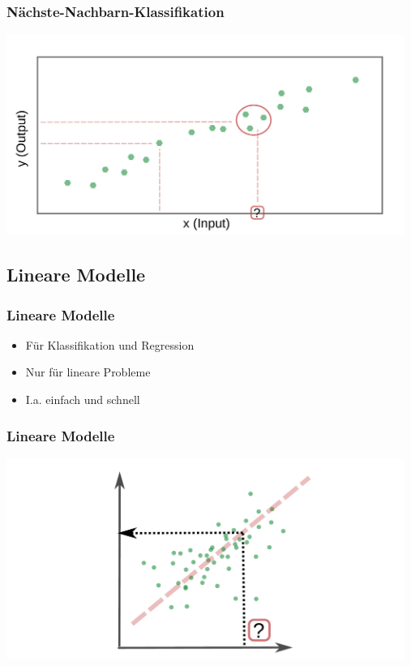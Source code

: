 \documentclass[aspectratio=169]{beamer}
\begin{document}
\begin{frame}
  \frametitle{Nächste-Nachbarn-Klassifikation}
  \begin{center}
    \includegraphics[width=13.0cm]{images/k_nearest_neighbour_regression_k_3.pdf}
  \end{center}
\end{frame}


\subsection{Lineare Modelle}

\setcounter{tocdepth}{2}
\begin{frame}{}
   \tableofcontents[currentsubsection,hideothersubsections,
     subsectionstyle=show/shaded]
\end{frame}

\begin{frame}
  \frametitle{Lineare Modelle}  
  \begin{block}{}
    \begin{itemize}
    \item Für Klassifikation und Regression
    \item Nur für lineare Probleme
    \item I.a. einfach und schnell
    \end{itemize}
  \end{block}
\end{frame}

\begin{frame}
  \frametitle{Lineare Modelle}
  \begin{center}
    \includegraphics[width=13.0cm]{images/Linear_Regression.pdf}
  \end{center}
\end{frame}
\end{document}
